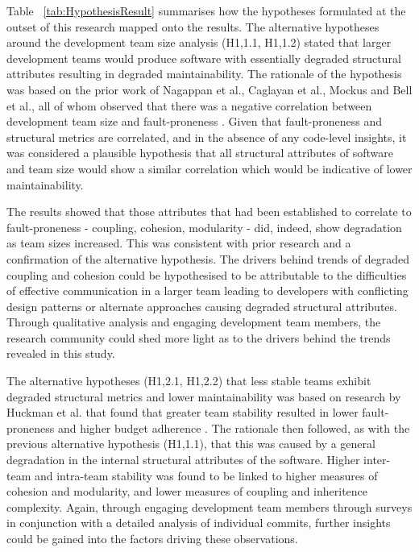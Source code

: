 Table ~\ref{tab:HypothesisResult} summarises how the hypotheses formulated at the outset of this research mapped onto the results. The alternative hypotheses around the development team size analysis (H1,1.1, H1,1.2) stated that larger development teams would produce software with essentially degraded structural attributes resulting in degraded maintainability. The rationale of the hypothesis was based on the prior work of Nagappan et al., Caglayan et al., Mockus and Bell et al., all of whom observed that there was a negative correlation between development team size and fault-proneness \citep{nagappan2008influence, mockus2010organizational, bell2013limited, caglayan2015merits}. Given that fault-proneness and structural metrics are correlated, and in the absence of any code-level insights, it was considered a plausible hypothesis that all structural attributes of software and team size would show a similar correlation which would be indicative of lower maintainability. 

The results showed that those attributes that had been established to correlate to fault-proneness - coupling, cohesion, modularity - did, indeed, show degradation as team sizes increased. This was consistent with prior research and a confirmation of the alternative hypothesis. The drivers behind trends of degraded coupling and cohesion could be hypothesised to be attributable to the difficulties of effective communication in a larger team leading to developers with conflicting design patterns or alternate approaches causing degraded structural attributes. Through qualitative analysis and engaging development team members, the research community could shed more light as to the drivers behind the trends revealed in this study.

The alternative hypotheses (H1,2.1, H1,2.2) that less stable teams exhibit degraded structural metrics and lower maintainability was based on research by Huckman et al. that found that greater team stability resulted in lower fault-proneness and higher budget adherence \citep{huckman2009team}. The rationale then followed, as with the previous alternative hypothesis (H1,1.1), that this was caused by a general degradation in the internal structural attributes of the software. Higher inter-team and intra-team stability was found to be linked to higher measures of cohesion and modularity, and lower measures of coupling and inheritence complexity. Again, through engaging development team members through surveys in conjunction with a detailed analysis of individual commits, further insights could be gained into the factors driving these observations.

